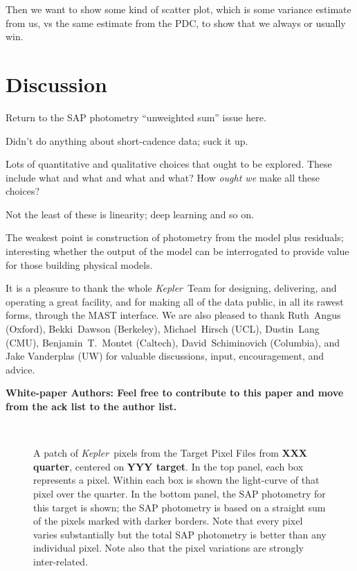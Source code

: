 \documentclass[12pt, preprint]{aastex}
\newcommand{\project}[1]{\textsl{#1}}
\newcommand{\Kepler}{\project{Kepler}}
\newcommand{\todo}[1]{\textbf{#1}}
\begin{document}
Then we want to show some kind of scatter plot, which is some variance estimate from us,
  vs the same estimate from the PDC,
  to show that we always or usually win.

\section{Discussion}

Return to the SAP photometry ``unweighted sum'' issue here.

Didn't do anything about short-cadence data; suck it up.

Lots of quantitative and qualitative choices that ought to be explored.
These include what and what and what and what?
How \emph{ought we} make all these choices?

Not the least of these is linearity; deep learning and so on.

The weakest point is construction of photometry from the model plus residuals;
  interesting whether the output of the model can be interrogated
  to provide value for those building physical models.

\acknowledgements
It is a pleasure to thank the whole \Kepler\ Team
  for designing, delivering, and operating a great facility,
  and for making all of the data public, in all its rawest forms, through the MAST interface.
We are also pleased to thank
  Ruth~Angus (Oxford),
  Bekki~Dawson (Berkeley),
  Michael~Hirsch (UCL),
  Dustin~Lang (CMU),
  Benjamin~T.~Montet (Caltech),
  David~Schiminovich (Columbia),
  and
  Jake Vanderplas (UW)
for valuable discussions, input, encouragement, and advice.

\todo{White-paper Authors:  Feel free to contribute to this paper and move from the ack list to the author list.}

\clearpage
\begin{figure}
~ %
\caption{A patch of \Kepler\ pixels from the Target Pixel Files
  from \todo{XXX quarter}, centered on \todo{YYY target}.
  In the top panel, each box represents a pixel.
  Within each box is shown the light-curve of that pixel over the quarter.
  In the bottom panel, the SAP photometry for this target is shown;
  the SAP photometry is based on a straight sum of the pixels marked with darker borders.
  Note that every pixel varies substantially but the total SAP photometry is better than any individual pixel.
  Note also that the pixel variations are strongly inter-related.\label{fig:pixelpatch}}
\end{figure}
\end{document}
